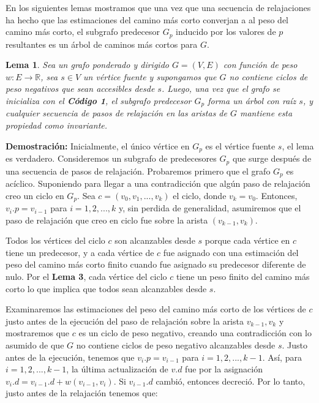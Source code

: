 \documentclass[12pt]{article}
\newcommand{\proof}{\textbf{Demostración:} }
\newcommand{\nl}{\vspace{0.3cm}}
\newtheorem{lemma}{Lema}
\begin{document}
\nl

En los siguientes lemas mostramos que una vez que una secuencia de relajaciones ha hecho que las estimaciones del camino más corto converjan a al peso del camino más corto, el subgrafo predecesor $G_p$ inducido por los valores de $p$ resultantes es un árbol de caminos más cortos para $G$.

\begin{lemma}
	Sea un grafo ponderado y dirigido $G = (V, E)$ con función de peso $w: E \rightarrow \mathbb{R}$, sea $s \in V$ un vértice fuente y supongamos que $G$ no contiene ciclos de peso negativos que sean accesibles desde $s$. Luego, una vez que el grafo se inicializa con el \textbf{Código 1}, el subgrafo predecesor $G_p$ forma un árbol con raíz $s$, y cualquier secuencia de pasos de relajación en las aristas de $G$ mantiene esta propiedad como invariante.
\end{lemma}

\proof Inicialmente, el único vértice en $G_p$ es el vértice fuente $s$, el lema es verdadero. Consideremos un subgrafo de predecesores $G_p$ que surge después de una secuencia de pasos de relajación. Probaremos primero que el grafo $G_p$ es acíclico. Suponiendo para llegar a una contradicción que algún paso de relajación creo un ciclo en $G_p$. Sea $c = (v_0, v_1, ..., v_k)$ el ciclo, donde $v_k = v_0$. Entonces, $v_{i}.p = v_{i-1}$ para $i = 1, 2, ..., k$ y, sin perdida de generalidad, asumiremos que el paso de relajación que creo en ciclo fue sobre la arista $(v_{k-1}, v_k)$.

\nl

Todos los vértices del ciclo $c$ son alcanzables desde $s$ porque cada vértice en $c$ tiene un predecesor, y a cada vértice de $c$ fue asignado con una estimación del peso del camino más corto finito cuando fue asignado su predecesor diferente de nulo. Por el \textbf{Lema 3}, cada vértice del ciclo $c$ tiene un peso finito del camino más corto lo que implica que todos sean alcanzables desde $s$.

\nl

Examinaremos las estimaciones del peso del camino más corto de los vértices de $c$ justo antes de la ejecución del paso de relajación sobre la arista $v_{k-1}, v_k$ y mostraremos que $c$ es un ciclo de peso negativo, creando una contradicción con lo asumido de que $G$ no contiene ciclos de peso negativo alcanzables desde $s$. Justo antes de la ejecución, tenemos que $v_{i}.p = v_{i-1}$ para $i = 1, 2, ..., k - 1$. Así, para $i = 1, 2, ..., k - 1$, la última actualización de $v.d$ fue por la asignación $v_{i}.d = v_{i-1}.d + w(v_{i-1}, v_{i})$. Si $v_{i-1}.d$ cambió, entonces decreció. Por lo tanto, justo antes de la relajación tenemos que:
\end{document}
